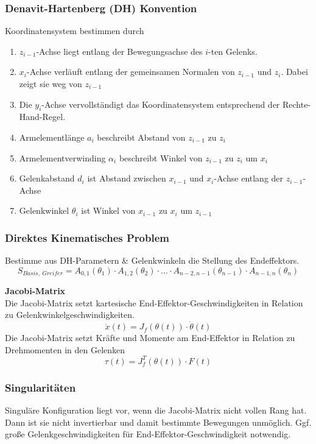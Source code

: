 \subsubsection{Denavit-Hartenberg (DH) Konvention}
Koordinatensystem bestimmen durch
\begin{enumerate}
\item \(z_{i-1}\)-Achse liegt entlang der Bewegungsachse des \(i\)-ten Gelenks.
\item \(x_i\)-Achse verläuft entlang der gemeinsamen Normalen von \(z_{i-1}\) und \(z_i\). Dabei zeigt sie weg von \(z_{i-1}\)
\item Die \(y_i\)-Achse vervollständigt das Koordinatensystem entsprechend der Rechte-Hand-Regel.
\item Armelementlänge \(a_i\) beschreibt Abstand von \(z_{i-1}\) zu \(z_i\)
\item Armelementverwinding \(\alpha_i\) beschreibt Winkel von \(z_{i-1}\) zu \(z_i\) um \(x_i\)
\item Gelenkabstand \(d_i\) ist Abstand zwischen \(x_{i-1}\) und \(x_i\)-Achse entlang der \(z_{i-1}\)-Achse
\item Gelenkwinkel \(\theta_i\) ist Winkel von \(x_{i-1}\) zu \(x_i\) um \(z_{i-1}\)
\end{enumerate}

\subsubsection{Direktes Kinematisches Problem}
Bestimme aus DH-Parametern \& Gelenkwinkeln die Stellung des Endeffektors.
\[S_{\mathit{Basis},\ \mathit{Greifer}} = A_{0,1}(\theta_1) \cdot A_{1,2}(\theta_2) \cdot \ldots
  \cdot A_{n-2,n-1}(\theta_{n-1}) \cdot A_{n-1, n}(\theta_n)\]

\textbf{Jacobi-Matrix}\\
Die Jacobi-Matrix setzt kartesische End-Effektor-Geschwindigkeiten in Relation zu Gelenkwinkelgeschwindigkeiten.
\[\dot{x}(t)=J_f(\theta(t)) \cdot \dot{\theta}(t)\]
Die Jacobi-Matrix setzt Kräfte und Momente am End-Effektor in Relation zu Drehmomenten in den Gelenken
\[\tau(t) = J_f^T(\theta(t)) \cdot F(t)\]

\subsubsection{Singularitäten}
Singuläre Konfiguration liegt vor, wenn die Jacobi-Matrix nicht vollen Rang hat.\\
Dann ist sie nicht invertierbar und damit bestimmte Bewegungen unmöglich. Ggf. große Gelenkgeschwindigkeiten
für End-Effektor-Geschwindigkeit notwendig.\\

